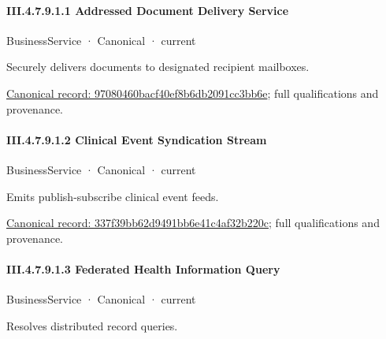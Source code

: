 \paragraph*{III.4.7.9.1.1 Addressed Document Delivery Service}
\label{navigation:III.4.7.9.1.1}

\label{element:97080460bacf40ef8b6db2091cc3bb6e}
{\small BusinessService · Canonical · current}\par

Securely delivers documents to designated recipient mailboxes.


{\footnotesize \href{../../../../continuum/business/business-service/97080460bacf40ef8b6db2091cc3bb6e.md}{Canonical record: 97080460bacf40ef8b6db2091cc3bb6e}; full qualifications and provenance.}\par
\paragraph*{III.4.7.9.1.2 Clinical Event Syndication Stream}
\label{navigation:III.4.7.9.1.2}

\label{element:337f39bb62d9491bb6e41c4af32b220c}
{\small BusinessService · Canonical · current}\par

Emits publish-subscribe clinical event feeds.


{\footnotesize \href{../../../../continuum/business/business-service/337f39bb62d9491bb6e41c4af32b220c.md}{Canonical record: 337f39bb62d9491bb6e41c4af32b220c}; full qualifications and provenance.}\par
\paragraph*{III.4.7.9.1.3 Federated Health Information Query}
\label{navigation:III.4.7.9.1.3}

\label{element:b4db5850f7114c968901966b4f6e36f5}
{\small BusinessService · Canonical · current}\par

Resolves distributed record queries.


